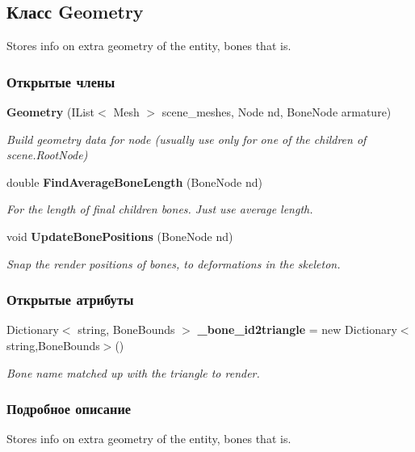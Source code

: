 \subsection{Класс Geometry}
\label{class_win_form_animation2_d_1_1_geometry}


Stores info on extra geometry of the entity, bones that is.  


\subsubsection*{Открытые члены}
\begin{DoxyCompactItemize}
\item 
{\bf Geometry} (I\+List$<$ Mesh $>$ scene\+\_\+meshes, Node nd, Bone\+Node armature)\label{class_win_form_animation2_d_1_1_geometry_abd05402398b233a02784515ecd0d329e}

\begin{DoxyCompactList}\small\item\em Build geometry data for node (usually use only for one of the children of scene.\+Root\+Node) \end{DoxyCompactList}\item 
double {\bf Find\+Average\+Bone\+Length} (Bone\+Node nd)\label{class_win_form_animation2_d_1_1_geometry_a5123f7b2e79b4ce84822970ed6538855}

\begin{DoxyCompactList}\small\item\em For the length of final children bones. Just use average length. \end{DoxyCompactList}\item 
void {\bf Update\+Bone\+Positions} (Bone\+Node nd)\label{class_win_form_animation2_d_1_1_geometry_afadeaea17a909ca4f78a559ceb1d044b}

\begin{DoxyCompactList}\small\item\em Snap the render positions of bones, to deformations in the skeleton. \end{DoxyCompactList}\end{DoxyCompactItemize}
\subsubsection*{Открытые атрибуты}
\begin{DoxyCompactItemize}
\item 
Dictionary$<$ string, Bone\+Bounds $>$ {\bf \+\_\+bone\+\_\+id2triangle} = new Dictionary$<$string,Bone\+Bounds$>$()\label{class_win_form_animation2_d_1_1_geometry_a761090d49c4ce3b88463957f76cefcdb}

\begin{DoxyCompactList}\small\item\em Bone name matched up with the triangle to render. \end{DoxyCompactList}\end{DoxyCompactItemize}


\subsubsection{Подробное описание}
Stores info on extra geometry of the entity, bones that is. 